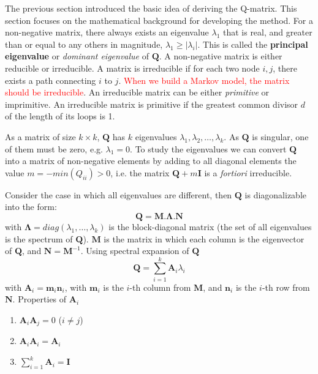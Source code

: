 The previous section introduced the basic idea of deriving the Q-matrix. This
section focuses on the mathematical background for developing the method. For a
non-negative matrix, there always exists an eigenvalue $\lambda_1$ that is real,
and greater than or equal to any others in magnitude, $\lambda_1 \ge
|\lambda_i|$. This is called the {\bf principal eigenvalue} or {\it dominant
eigenvalue} of $\mathbf{Q}$. A non-negative matrix  is either reducible or
irreducible. A matrix is irreducible if for each two node $i, j$, there exists a
path connecting $i$ to $j$. \textcolor{red}{When we build a Markov model, the
matrix should be irreducible}. An irreducible matrix can be either {\it
primitive} or imprimitive. An irreducible matrix is primitive if the greatest
common divisor  $d$ of the length of its loops is 1.

As a matrix of size $k\times k$, $\mathbf{Q}$ has $k$ eigenvalues $\lambda_1,
\lambda_2, \ldots, \lambda_k$. As $\mathbf{Q}$ is singular, one of them must be
zero, e.g. $\lambda_1=0$. To study the eigenvalues we can convert $\mathbf{Q}$
into a matrix of non-negative elements by adding to all diagonal elements the value
$m=-min(Q_{ii})> 0$, i.e. the matrix $\mathbf{Q} + m\mathbf{I}$ is a {\it
fortiori} irreducible.

Consider the case in which all eigenvalues are different, then $\mathbf{Q}$
is diagonalizable into the form:
\begin{equation}
\mathbf{Q}=\mathbf{M.\Lambda.N}
\end{equation}
with $\mathbf{\Lambda}=diag(\lambda_1, \ldots,\lambda_k)$ is the
block-diagonal matrix (the set of all eigenvalues is the spectrum of
$\mathbf{Q}$). $\mathbf{M}$ is the matrix in which each column is the
eigenvector of $\mathbf{Q}$, and $\mathbf{N=M}^{-1}$.
Using spectral expansion of $\mathbf{Q}$
\begin{equation}
\mathbf{Q} = \sum\limits_{i=1}^k \mathbf{A}_i\lambda_i
\end{equation}
with $\mathbf{A}_i=\mathbf{m}_i\mathbf{n}_i$, with $\mathbf{m}_i$ is the $i$-th
column from $\mathbf{M}$, and $\mathbf{n}_i$ is the $i$-th row from
$\mathbf{N}$. Properties of $\mathbf{A}_i$
\begin{enumerate}
  \item $\mathbf{A}_i\mathbf{A}_j=0$ ($i\ne j$)
  \item $\mathbf{A}_i\mathbf{A}_i=\mathbf{A}_i$
  \item $\sum\limits_{i=1}^k\mathbf{A}_i = \mathbf{I}$
\end{enumerate}

